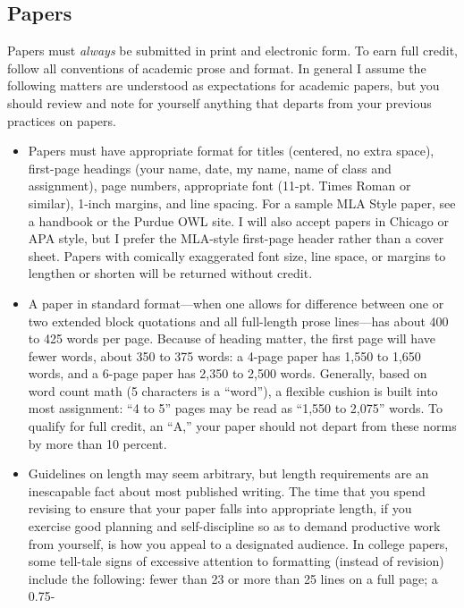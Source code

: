 \documentclass[]{article}
\begin{document}
\subsection{Papers}\label{papers}

Papers must \emph{always} be submitted in print and electronic form. To
earn full credit, follow all conventions of academic prose and format.
In general I assume the following matters are understood as expectations
for academic papers, but you should review and note for yourself
anything that departs from your previous practices on papers.

\begin{itemize}
\item
  Papers must have appropriate format for titles (centered, no extra
  space), first-page headings (your name, date, my name, name of class
  and assignment), page numbers, appropriate font (11-pt. Times Roman or
  similar), 1-inch margins, and line spacing. For a sample MLA Style
  paper, see a handbook or the Purdue OWL site. I will also accept
  papers in Chicago or APA style, but I prefer the MLA-style first-page
  header rather than a cover sheet. Papers with comically exaggerated
  font size, line space, or margins to lengthen or shorten will be
  returned without credit.
\item
  A paper in standard format---when one allows for difference between
  one or two extended block quotations and all full-length prose
  lines---has about 400 to 425 words per page. Because of heading
  matter, the first page will have fewer words, about 350 to 375 words:
  a 4-page paper has 1,550 to 1,650 words, and a 6-page paper has 2,350
  to 2,500 words. Generally, based on word count math (5 characters is a
  ``word''), a flexible cushion is built into most assignment: ``4 to
  5'' pages may be read as ``1,550 to 2,075'' words. To qualify for full
  credit, an ``A,'' your paper should not depart from these norms by
  more than 10 percent.
\item
  Guidelines on length may seem arbitrary, but length requirements are
  an inescapable fact about most published writing. The time that you
  spend revising to ensure that your paper falls into appropriate
  length, if you exercise good planning and self-discipline so as to
  demand productive work from yourself, is how you appeal to a
  designated audience. In college papers, some tell-tale signs of
  excessive attention to formatting (instead of revision) include the
  following: fewer than 23 or more than 25 lines on a full page; a 0.75-

\end{itemize}
\end{document}
